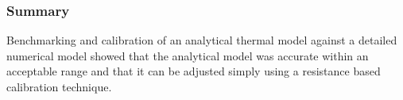 

\begin{frame}[ctb!]
  \frametitle{Summary}
  Benchmarking and calibration of an analytical thermal model against a detailed 
  numerical model showed that the analytical model was accurate within an 
  acceptable range and that it can be adjusted simply using a resistance based 
  calibration technique. 
\end{frame}

